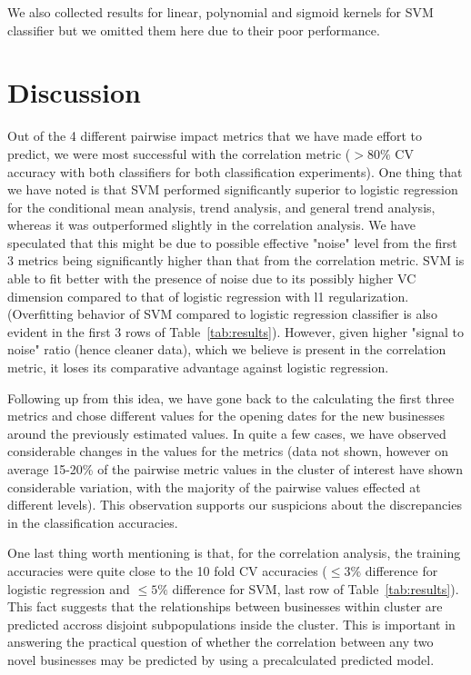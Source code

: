 \documentclass{vldb}
\begin{document}
We also collected results for linear, polynomial and sigmoid kernels for SVM classifier but we omitted them here due to their poor performance.

\section{Discussion}

Out of the 4 different pairwise impact metrics that we have made effort to predict, we were most successful with the correlation metric ($>80\%$ CV accuracy with both classifiers for both classification experiments). 
One thing that we have noted is that SVM performed significantly superior to logistic regression for the conditional mean analysis, trend analysis, and general trend analysis, whereas it was outperformed slightly in the correlation analysis. We have speculated that this might be due to possible effective "noise" level from the first 3 metrics being significantly higher than that from the correlation metric. 
SVM is able to fit better with the presence of noise due to its possibly higher VC dimension compared to that of logistic regression with l1 regularization.(Overfitting behavior of SVM compared to logistic regression classifier is also evident in the first 3 rows of Table~\ref{tab:results}). 
However, given higher "signal to noise" ratio (hence cleaner data), which we believe is present in the correlation metric, it loses its comparative advantage against logistic regression. 

Following up from this idea, we have gone back to the calculating the first three metrics and chose different values for the opening dates for the new businesses around the previously estimated values. In quite a few cases, we have observed considerable changes in the values for the metrics (data not shown, however on average 15-20\% of the pairwise metric values in the cluster of interest have shown considerable variation, with the majority of the pairwise values effected at different levels). This observation supports our suspicions about the discrepancies in the classification accuracies.

One last thing worth mentioning is that, for the correlation analysis, the training accuracies were quite close to the 10 fold CV accuracies ($\le 3\%$ difference for logistic regression and $\le 5\%$ difference for SVM, last row of Table~\ref{tab:results}). This fact suggests that the relationships between businesses within cluster are predicted accross disjoint subpopulations inside the cluster. This is important in answering the practical question of whether the correlation between any two novel businesses may be predicted by using a precalculated predicted model.
\end{document}
